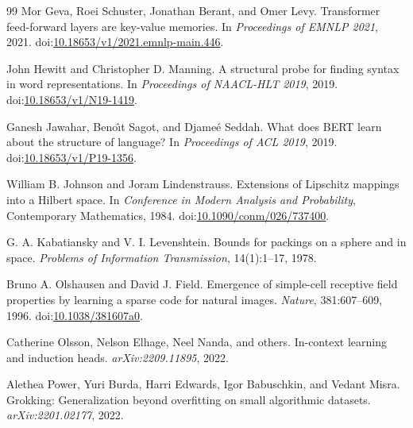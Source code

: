 \begin{thebibliography}{99}
Mor Geva, Roei Schuster, Jonathan Berant, and Omer Levy.
\newblock Transformer feed-forward layers are key-value memories.
\newblock In \emph{Proceedings of EMNLP 2021}, 2021.
\newblock doi:\href{https://doi.org/10.18653/v1/2021.emnlp-main.446}{10.18653/v1/2021.emnlp-main.446}.

John Hewitt and Christopher D. Manning.
\newblock A structural probe for finding syntax in word representations.
\newblock In \emph{Proceedings of NAACL-HLT 2019}, 2019.
\newblock doi:\href{https://doi.org/10.18653/v1/N19-1419}{10.18653/v1/N19-1419}.

Ganesh Jawahar, Beno{\^\i}t Sagot, and Djame{\'e} Seddah.
\newblock What does BERT learn about the structure of language?
\newblock In \emph{Proceedings of ACL 2019}, 2019.
\newblock doi:\href{https://doi.org/10.18653/v1/P19-1356}{10.18653/v1/P19-1356}.

William B. Johnson and Joram Lindenstrauss.
\newblock Extensions of Lipschitz mappings into a Hilbert space.
\newblock In \emph{Conference in Modern Analysis and Probability}, Contemporary Mathematics, 1984.
\newblock doi:\href{https://doi.org/10.1090/conm/026/737400}{10.1090/conm/026/737400}.

G. A. Kabatiansky and V. I. Levenshtein.
\newblock Bounds for packings on a sphere and in space.
\newblock \emph{Problems of Information Transmission}, 14(1):1--17, 1978.

Bruno A. Olshausen and David J. Field.
\newblock Emergence of simple-cell receptive field properties by learning a sparse code for natural images.
\newblock \emph{Nature}, 381:607--609, 1996.
\newblock doi:\href{https://doi.org/10.1038/381607a0}{10.1038/381607a0}.

Catherine Olsson, Nelson Elhage, Neel Nanda, and others.
\newblock In-context learning and induction heads.
\newblock \emph{arXiv:2209.11895}, 2022.

Alethea Power, Yuri Burda, Harri Edwards, Igor Babuschkin, and Vedant Misra.
\newblock Grokking: Generalization beyond overfitting on small algorithmic datasets.
\newblock \emph{arXiv:2201.02177}, 2022.


\end{thebibliography}
